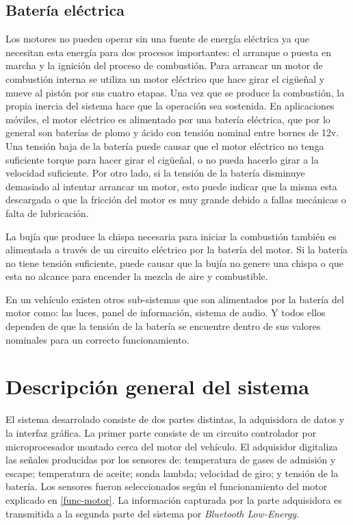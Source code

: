 \subsection{Batería eléctrica}
Los motores no pueden operar sin una fuente de energía eléctrica ya que necesitan esta energía para dos procesos importantes: el arranque o puesta en marcha y la ignición del proceso de combustión.
Para arrancar un motor de combustión interna se utiliza un motor eléctrico que hace girar el cigüeñal y mueve al pistón por sus cuatro etapas. Una vez que se produce la combustión, la propia inercia del sistema hace que la operación sea sostenida. En aplicaciones móviles, el motor eléctrico es alimentado por una batería eléctrica, que por lo general son baterías de plomo y ácido con tensión nominal entre bornes de 12v. Una tensión baja de la batería puede causar que el motor eléctrico no tenga suficiente torque para hacer girar el cigüeñal, o no pueda hacerlo girar a la velocidad suficiente. Por otro lado, si la tensión de la batería disminuye demasiado al intentar arrancar un motor, esto puede indicar que la misma esta descargada o que la fricción del motor es muy grande debido a fallas mecánicas o falta de lubricación.

La bujía que produce la chispa necesaria para iniciar la combustión también es alimentada a través de un circuito eléctrico por la batería del motor. Si la batería no tiene tensión suficiente, puede causar que la bujía no genere una chispa o que esta no alcance para encender la mezcla de aire y combustible.

En un vehículo existen otros sub-sistemas que son alimentados por la batería del motor como: las luces, panel de información, sistema de audio. Y todos ellos dependen de que la tensión de la batería se encuentre dentro de sus valores nominales para un correcto funcionamiento.

\section{Descripción general del sistema}

El sistema desarrolado consiste de dos partes distintas, la adquisidora de datos y la interfaz gráfica. La primer parte consiste de un circuito controlador por microprocesador montado cerca del motor del vehículo. El adquisidor digitaliza las señales producidas por los sensores de: temperatura de gases de admisión y escape; temperatura de aceite; sonda lambda; velocidad de giro; y tensión de la batería. Los sensores fueron seleccionados según el funcionamiento del motor explicado en \ref{func-motor}.  La información capturada por la parte adquisidora es transmitida a la segunda parte del sistema por \textit{Bluetooth Low-Energy}.

